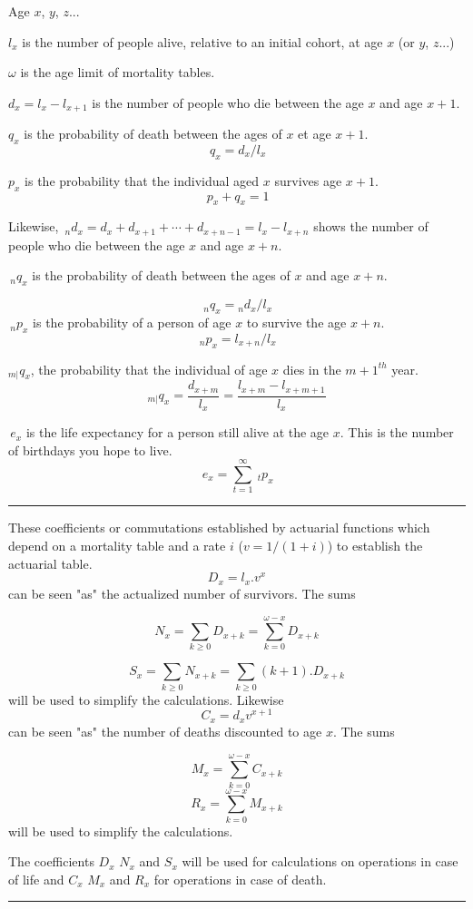 
\begin{f}

Age \(x\), \(y\), \(z\)...    

\(l_x\) is the number of people alive, relative to an initial cohort, at age \(x\) (or \(y\), \(z\)...)

\(\omega\) is the age limit of mortality tables.

\(d_x=l_x-l_{x+1}\) is the number of people who die between the age \(x\) and age \(x+1\).

\(q_x\) is the probability of death between the ages of \(x\) et age \(x+1\).
\[
\,q_x = d_x / l_x 
\]

\(p_x\) is the probability that the individual aged \(x\) survives age \(x+1\).
\[
\,p_x+q_x=1 
\]

Likewise,
\(\,_nd_x = d_x + d_{x+1} + \cdots + d_{x+n-1} = l_x - l_{x+n}\) shows the number of people who die between the age \(x\) and age \(x+n\).

\(\,_nq_x\) is the probability of death between the ages of \(x\) and age \(x+n\).

\[
\,_nq_x = {}_nd_x / l_x
\]
\(\,_np_x\) is the probability of a person of age \(x\) to survive the age \(x+n\).
\[
\,_np_x = l_{x+n} / l_x 
\]


\({}_{m|}q_{x}\), the probability that the individual of age \(x\) dies in the \({m+1}^{th}\) year.
\[{}_{m|}q_{x}=\frac{d_{x+m}}{l_x}=\frac{l_{x+m}-l_{x+m+1}}{l_x}\]

\(\,e_x\) is the life expectancy for a person still alive at the age \(x\). 
This is the number of birthdays you hope to live.
\[
\,e_x = \sum_{t=1}^{\infty} \ _tp_x 
\]
\end{f}
\hrule

\begin{f}


These coefficients or commutations established by actuarial functions which depend on a mortality table and a rate \(i\) (\(v=1/(1+i)\)) to establish the actuarial table.
\[
D_x=l_x .v^x
\]
can be seen "as" the actualized number of survivors. The sums

\[
N_x=\sum_{k\geq 0} D_{x+k}=\sum_{k= 0}^{\omega-x} D_{x+k}
\]

\[
S_x=\sum_{k\geq 0} N_{x+k}=\sum_{k\geq 0}(k+1). D_{x+k}
\]
will be used to simplify the calculations.
Likewise
\[
C_x = d_x v^{ x+1} 
\]
can be seen "as" the number of deaths discounted to age \(x\). The sums

\[
M_x=\sum_{k= 0}^{\omega-x} C_{x+k}
\]
\[
R_x=\sum_{k= 0}^{\omega-x} M_{x+k}
\]
will be used to simplify the calculations.

The coefficients \(D_x\) \(N_x\) and \(S_x\) will be used for calculations on operations in case of life and \(C_x\) \(M_x\) and \(R_x\) for operations in case of death.

\end{f} 
\hrule

